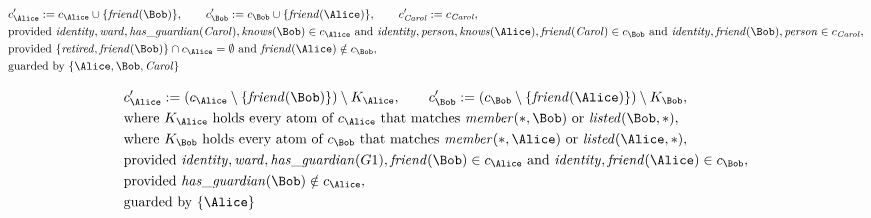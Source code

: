 \begin{align*}
&
c'_
{
\Alice
}
 := 
c_
{
\Alice
}
 \cup 
\{
\mathit{\detokenize{
friend
}}
(
\Bob
)
\}
, \qquad 
c'_
{
\Bob
}
 := 
c_
{
\Bob
}
 \cup 
\{
\mathit{\detokenize{
friend
}}
(
\Alice
)
\}
, \qquad 
c'_
{
\mathit{Carol}
}
 := 
c_
{
\mathit{Carol}
}
,\\
&
\text{provided } 
\mathit{\detokenize{
identity
}}
,
\mathit{\detokenize{
ward
}}
,
\mathit{\detokenize{
has_guardian
}}
(
\mathit{Carol}
)
,
\mathit{\detokenize{
knows
}}
(
\Bob
)
 \in c_
{
\Alice
}
 \text{ and } 
\mathit{\detokenize{
identity
}}
,
\mathit{\detokenize{
person
}}
,
\mathit{\detokenize{
knows
}}
(
\Alice
)
,
\mathit{\detokenize{
friend
}}
(
\mathit{Carol}
)
 \in c_
{
\Bob
}
 \text{ and } 
\mathit{\detokenize{
identity
}}
,
\mathit{\detokenize{
friend
}}
(
\Bob
)
,
\mathit{\detokenize{
person
}}
 \in c_
{
\mathit{Carol}
}
,\\
&
\text{provided } 
\{
\mathit{\detokenize{
retired
}}
,
\mathit{\detokenize{
friend
}}
(
\Bob
)
\}
 \cap c_
{
\Alice
}
 = \emptyset
 \text{ and } 
\mathit{\detokenize{
friend
}}
(
\Alice
)
 \notin c_
{
\Bob
}
,\\
&
\text{guarded by } \{
\Alice
,
\Bob
,
\mathit{Carol}
\}
\end{align*}

\begin{align*}
&
c'_
{
\Alice
}
 := 
(c_
{
\Alice
}
 \setminus 
\{
\mathit{\detokenize{
friend
}}
(
\Bob
)
\}
) \setminus K_
{
\Alice
}
, \qquad 
c'_
{
\Bob
}
 := 
(c_
{
\Bob
}
 \setminus 
\{
\mathit{\detokenize{
friend
}}
(
\Alice
)
\}
) \setminus K_
{
\Bob
}
,\\
&
\text{where } K_
{
\Alice
}
 \text{ holds every atom of } c_
{
\Alice
}
 \text{ that matches } 
\mathit{\detokenize{
member
}}
(
\ast
,
\Bob
)
 \text{ or } 
\mathit{\detokenize{
listed
}}
(
\Bob
,
\ast
)
,\\
&
\text{where } K_
{
\Bob
}
 \text{ holds every atom of } c_
{
\Bob
}
 \text{ that matches } 
\mathit{\detokenize{
member
}}
(
\ast
,
\Alice
)
 \text{ or } 
\mathit{\detokenize{
listed
}}
(
\Alice
,
\ast
)
,\\
&
\text{provided } 
\mathit{\detokenize{
identity
}}
,
\mathit{\detokenize{
ward
}}
,
\mathit{\detokenize{
has_guardian
}}
(
G1
)
,
\mathit{\detokenize{
friend
}}
(
\Bob
)
 \in c_
{
\Alice
}
 \text{ and } 
\mathit{\detokenize{
identity
}}
,
\mathit{\detokenize{
friend
}}
(
\Alice
)
 \in c_
{
\Bob
}
,\\
&
\text{provided } 
\mathit{\detokenize{
has_guardian
}}
(
\Bob
)
 \notin c_
{
\Alice
}
,\\
&
\text{guarded by } \{
\Alice
\}
\end{align*}
